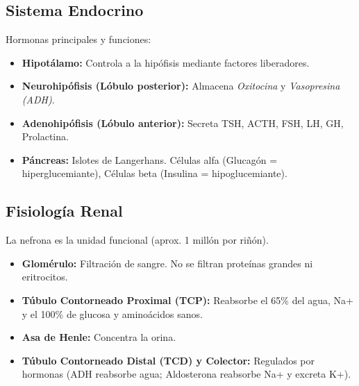 \subsection{Sistema Endocrino}
Hormonas principales y funciones:
\begin{itemize}
    \item \textbf{Hipotálamo:} Controla a la hipófisis mediante factores liberadores.
    \item \textbf{Neurohipófisis (Lóbulo posterior):} Almacena \textit{Oxitocina} y \textit{Vasopresina (ADH)}.
    \item \textbf{Adenohipófisis (Lóbulo anterior):} Secreta TSH, ACTH, FSH, LH, GH, Prolactina.
    \item \textbf{Páncreas:} Islotes de Langerhans. Células alfa (Glucagón = hiperglucemiante), Células beta (Insulina = hipoglucemiante).
\end{itemize}

\subsection{Fisiología Renal}
La nefrona es la unidad funcional (aprox. 1 millón por riñón).
\begin{itemize}
    \item \textbf{Glomérulo:} Filtración de sangre. No se filtran proteínas grandes ni eritrocitos.
    \item \textbf{Túbulo Contorneado Proximal (TCP):} Reabsorbe el 65\% del agua, Na+ y el 100\% de glucosa y aminoácidos sanos.
    \item \textbf{Asa de Henle:} Concentra la orina.
    \item \textbf{Túbulo Contorneado Distal (TCD) y Colector:} Regulados por hormonas (ADH reabsorbe agua; Aldosterona reabsorbe Na+ y excreta K+).
\end{itemize}

\newpage
